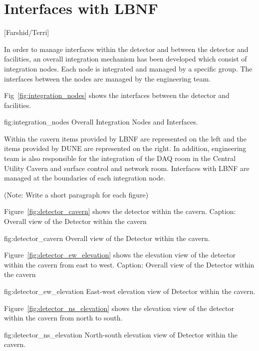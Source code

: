 \chapter{Interfaces with LBNF}
\label{vl:tc-lbnf}

[Farshid/Terri]

In order to manage interfaces within the detector and between the
detector and facilities, an overall integration mechanism has been
developed which consist of integration nodes. Each node is integrated
and managed by a specific group. The interfaces between the nodes are
managed by the  engineering team.


Fig~\ref{fig:integration_nodes}  shows the interfaces between the detector and facilities.
\begin{dunefigure}{fig:integration_nodes}
  {Overall Integration Nodes and Interfaces.}
\end{dunefigure}
Within the cavern items provided by LBNF are represented on the left
and the items provided by DUNE are represented on the right. In
addition,  engineering team is also responsible for the
integration of the DAQ room in the Central Utility Cavern and surface
control and network room. Interfaces with LBNF are managed at the
boundaries of each integration node.

(Note: Write a short paragraph for each figure)


Figure~\ref{fig:detector_cavern} shows the detector within the cavern.
Caption: Overall view of the Detector within the cavern
\begin{dunefigure}{fig:detector_cavern}
  {Overall view of the Detector within the cavern.}
\end{dunefigure}

Figure~\ref{fig:detector_ew_elevation} shows the elevation view of the
detector within the cavern from east to west.  Caption: Overall view
of the Detector within the cavern
\begin{dunefigure}{fig:detector_ew_elevation}
  {East-west elevation view of Detector within the cavern.}
\end{dunefigure}

Figure~\ref{fig:detector_ns_elevation} shows the elevation view of the
detector within the cavern from north to south.
\begin{dunefigure}{fig:detector_ns_elevation}
  {North-south elevation view of Detector within the cavern.}
\end{dunefigure}



